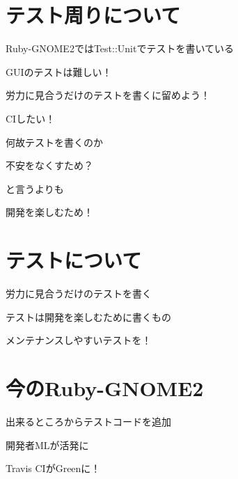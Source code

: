 \section{テスト周りについて}
\begin{frame}
\begin{itemize}
{\huge
\item{} Ruby-GNOME2ではTest::Unitでテストを書いている
\item{} GUIのテストは難しい！
\item{} 労力に見合うだけのテストを書くに留めよう！
\item{} CIしたい！
}
\end{itemize}
\end{frame}

\begin{frame}
\begin{center}
{\Huge
\item 何故テストを書くのか
}
\end{center}
\end{frame}

\begin{frame}
\begin{center}
{\Huge
\item 不安をなくすため？
}
\end{center}
\end{frame}

\begin{frame}
\begin{center}
{\Huge
\item と言うよりも
}
\end{center}
\end{frame}

\begin{frame}
\begin{center}
{\Huge
開発を楽しむため！
}
\end{center}
\end{frame}

\section{テストについて}

\begin{frame}
\begin{itemize}
{\huge
\item{} 労力に見合うだけのテストを書く
\item{} テストは開発を楽しむために書くもの
\item{} メンテナンスしやすいテストを！
}
\end{itemize}
\end{frame}

\section{今のRuby-GNOME2}
\begin{frame}
\begin{itemize}
{\huge
\item 出来るところからテストコードを追加
\item 開発者MLが活発に
\item Travis CIがGreenに！
}
\end{itemize}
\end{frame}
